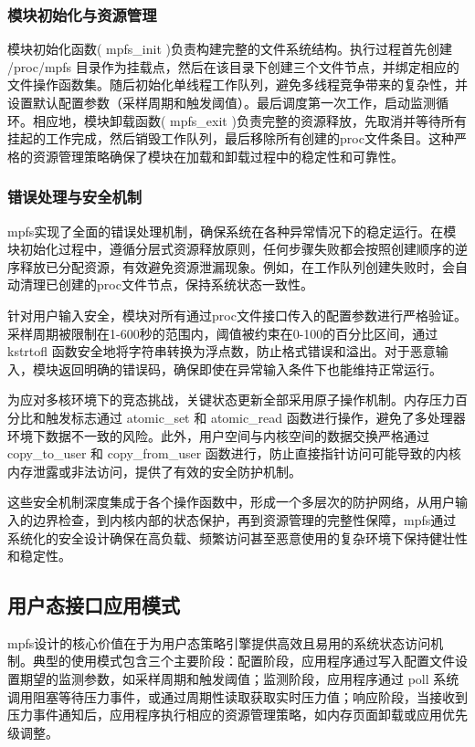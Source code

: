 \subsubsection{模块初始化与资源管理}

模块初始化函数( mpfs\_init )负责构建完整的文件系统结构。执行过程首先创建 /proc/mpfs 目录作为挂载点，然后在该目录下创建三个文件节点，并绑定相应的文件操作函数集。随后初始化单线程工作队列，避免多线程竞争带来的复杂性，并设置默认配置参数（采样周期和触发阈值）。最后调度第一次工作，启动监测循环。相应地，模块卸载函数( mpfs\_exit )负责完整的资源释放，先取消并等待所有挂起的工作完成，然后销毁工作队列，最后移除所有创建的proc文件条目。这种严格的资源管理策略确保了模块在加载和卸载过程中的稳定性和可靠性。

\subsubsection{错误处理与安全机制}

mpfs实现了全面的错误处理机制，确保系统在各种异常情况下的稳定运行。在模块初始化过程中，遵循分层式资源释放原则，任何步骤失败都会按照创建顺序的逆序释放已分配资源，有效避免资源泄漏现象。例如，在工作队列创建失败时，会自动清理已创建的proc文件节点，保持系统状态一致性。

针对用户输入安全，模块对所有通过proc文件接口传入的配置参数进行严格验证。采样周期被限制在1-600秒的范围内，阈值被约束在0-100的百分比区间，通过 kstrtofl 函数安全地将字符串转换为浮点数，防止格式错误和溢出。对于恶意输入，模块返回明确的错误码，确保即使在异常输入条件下也能维持正常运行。

为应对多核环境下的竞态挑战，关键状态更新全部采用原子操作机制。内存压力百分比和触发标志通过 atomic\_set 和 atomic\_read 函数进行操作，避免了多处理器环境下数据不一致的风险。此外，用户空间与内核空间的数据交换严格通过 copy\_to\_user 和 copy\_from\_user 函数进行，防止直接指针访问可能导致的内核内存泄露或非法访问，提供了有效的安全防护机制。

这些安全机制深度集成于各个操作函数中，形成一个多层次的防护网络，从用户输入的边界检查，到内核内部的状态保护，再到资源管理的完整性保障，mpfs通过系统化的安全设计确保在高负载、频繁访问甚至恶意使用的复杂环境下保持健壮性和稳定性。

\subsection{用户态接口应用模式}

mpfs设计的核心价值在于为用户态策略引擎提供高效且易用的系统状态访问机制。典型的使用模式包含三个主要阶段：配置阶段，应用程序通过写入配置文件设置期望的监测参数，如采样周期和触发阈值；监测阶段，应用程序通过 poll 系统调用阻塞等待压力事件，或通过周期性读取获取实时压力值；响应阶段，当接收到压力事件通知后，应用程序执行相应的资源管理策略，如内存页面卸载或应用优先级调整。

